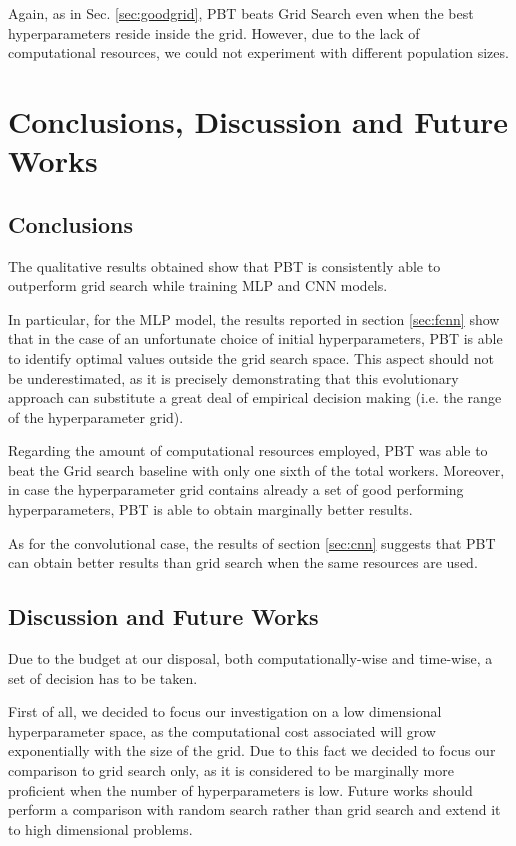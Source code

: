 \documentclass{article}
\begin{document}
Again, as in Sec. \ref{sec:goodgrid}, PBT beats Grid Search even when the best hyperparameters reside inside the grid. However, due to the lack of computational resources, we could not experiment with different population sizes.

\section{Conclusions, Discussion and Future Works}
\label{sec:discussion}

\subsection{Conclusions}

The qualitative results obtained show that PBT is consistently able to outperform grid search while training MLP and CNN models.

In particular, for the MLP model, the results reported in section \ref{sec:fcnn} show that in the case of an unfortunate choice of initial hyperparameters, PBT is able to identify optimal values outside the grid search space. This aspect should not be underestimated, as it is precisely demonstrating that this evolutionary approach can substitute a great deal of empirical decision making (i.e. the range of the hyperparameter grid). 

Regarding the amount of computational resources employed, PBT was able to beat the Grid search baseline with only one sixth of the total workers. Moreover, in case the hyperparameter grid contains already a set of good performing hyperparameters, PBT is able to obtain marginally better results.

As for the convolutional case, the results of section \ref{sec:cnn} suggests that PBT can obtain better results than grid search when the same resources are used.

\subsection{Discussion and Future Works}

Due to the budget at our disposal, both computationally-wise and time-wise, a set of decision has to be taken.

First of all, we decided to focus our investigation on a low dimensional hyperparameter space, as the computational cost associated will grow exponentially with the size of the grid. Due to this fact we decided to focus our comparison to grid search only, as it is considered to be marginally more proficient when the number of hyperparameters is low\cite{Bergstra:2012:RSH:2188385.2188395}. 
Future works should perform a comparison with random search rather than grid search and extend it to high dimensional problems.
\end{document}
